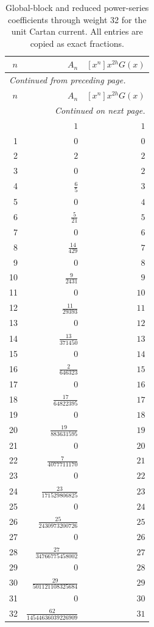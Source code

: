 \begingroup\small
\setlength{\tabcolsep}{5pt}
\begin{longtable}{rrr}
\caption{Global-block and reduced power-series coefficients through weight 32 for the unit Cartan current. All entries are copied as exact fractions.}\label{expphysics:blocks-unit_Cartan}\\
\toprule
$n$ & $A_n$ & $[x^n]x^{2h}G(x)$\\
\midrule
\endfirsthead
\multicolumn{3}{l}{\small\itshape Continued from preceding page.}\\
\toprule
$n$ & $A_n$ & $[x^n]x^{2h}G(x)$\\
\midrule
\endhead
\midrule
\multicolumn{3}{r}{\small\itshape Continued on next page.}\\
\endfoot
\bottomrule
\endlastfoot
0 & $1$ & $1$\\
1 & $0$ & $0$\\
2 & $2$ & $2$\\
3 & $0$ & $2$\\
4 & $\frac{6}{5}$ & $3$\\
5 & $0$ & $4$\\
6 & $\frac{5}{21}$ & $5$\\
7 & $0$ & $6$\\
8 & $\frac{14}{429}$ & $7$\\
9 & $0$ & $8$\\
10 & $\frac{9}{2431}$ & $9$\\
11 & $0$ & $10$\\
12 & $\frac{11}{29393}$ & $11$\\
13 & $0$ & $12$\\
14 & $\frac{13}{371450}$ & $13$\\
15 & $0$ & $14$\\
16 & $\frac{2}{646323}$ & $15$\\
17 & $0$ & $16$\\
18 & $\frac{17}{64822395}$ & $17$\\
19 & $0$ & $18$\\
20 & $\frac{19}{883631595}$ & $19$\\
21 & $0$ & $20$\\
22 & $\frac{7}{4077711170}$ & $21$\\
23 & $0$ & $22$\\
24 & $\frac{23}{171529806825}$ & $23$\\
25 & $0$ & $24$\\
26 & $\frac{25}{2430973200726}$ & $25$\\
27 & $0$ & $26$\\
28 & $\frac{27}{34766775458002}$ & $27$\\
29 & $0$ & $28$\\
30 & $\frac{29}{501121108325684}$ & $29$\\
31 & $0$ & $30$\\
32 & $\frac{62}{14544636039226909}$ & $31$\\
\end{longtable}
\endgroup
